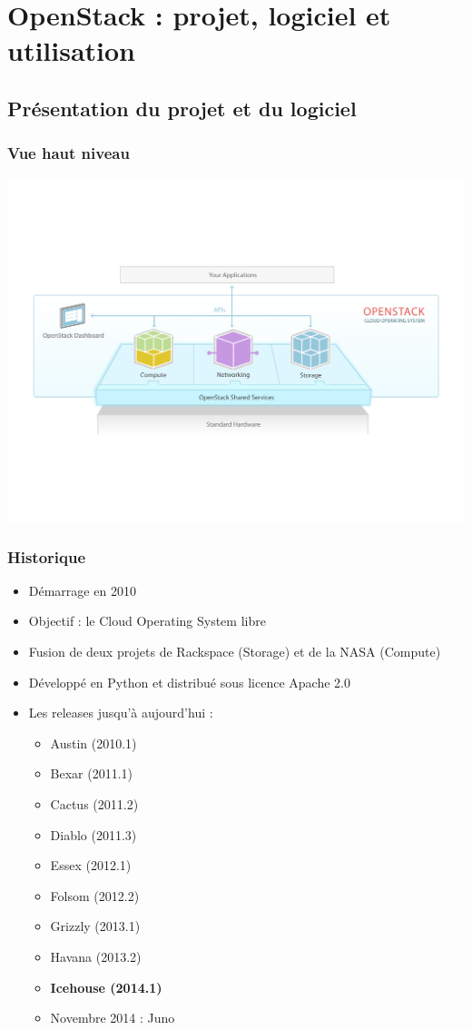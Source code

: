   \section[OpenStack]{OpenStack : projet, logiciel et utilisation}

  \subsection[OpenStack]{Présentation du projet et du logiciel}

  \begin{frame}
    \frametitle{Vue haut niveau}
    \includegraphics[width=\textwidth]{images/openstack-software-diagram.pdf}
  \end{frame}

  \begin{frame}
    \frametitle{Historique}
    \begin{itemize}
      \item Démarrage en 2010
      \item Objectif : le Cloud Operating System libre
      \item Fusion de deux projets de Rackspace (Storage) et de la NASA (Compute)
      \item Développé en Python et distribué sous licence Apache 2.0\pause
      \item Les releases jusqu'à aujourd'hui :
      \begin{itemize}
        \item Austin (2010.1)
        \item Bexar (2011.1)
        \item Cactus (2011.2)
        \item Diablo (2011.3)
        \item Essex (2012.1)
        \item Folsom (2012.2)
        \item Grizzly (2013.1)
        \item Havana (2013.2)
        \item \textbf{Icehouse (2014.1)}\pause
        \item Novembre 2014 : Juno
      \end{itemize}
    \end{itemize}
  \end{frame}

